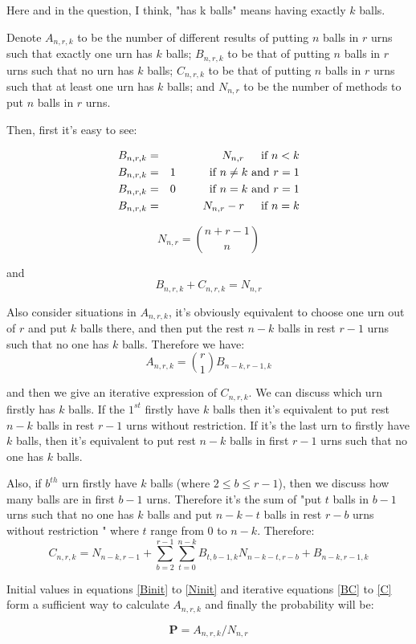 \documentclass[11pt]{article}
\begin{document}
Here and in the question, I think, "has k balls" means having exactly $k$ balls.

Denote $A_{n,r,k}$ to be the number of different results of putting $n$ balls in $r$ urns such that exactly one urn has $k$ balls; $B_{n,r,k}$ to be that of putting $n$ balls in $r$ urns such that no urn has $k$ balls;  $C_{n,r,k}$ to be that of putting $n$ balls in $r$ urns such that at least one urn has $k$ balls; and $N_{n,r}$ to be the number of methods to put $n$ balls in $r$ urns.

Then, first it's easy to see:

\begin{eqnarray} \label{Binit}
B_{n,r,k} &=& N_{n,r} \hspace{1.5em} \text{if $n < k$} \\
B_{n,r,k} &=& 1 \hspace{3em} \text{if $n \neq k$ and $r = 1$} \\
B_{n,r,k} &=& 0 \hspace{3em} \text{if $n = k$ and $r = 1$} \\
B_{n,r,k} &=& N_{n,r} - r \hspace{1.5em} \text{if $n = k$} 
\end{eqnarray}

\begin{equation} \label{Ninit}
N_{n,r} = \binom{n+r-1}{n}
\end{equation}

and 
\begin{equation} \label{BC}
B_{n,r,k} + C_{n,r,k} = N_{n,r}
\end{equation}

Also consider situations in $A_{n,r,k}$, it's obviously equivalent to choose one urn out of $r$ and put $k$ balls there, and then put the rest $n-k$ balls in rest $r-1$ urns such that no one has $k$ balls. Therefore we have:
\begin{equation} \label{A} 
A_{n,r,k} = \binom{r}{1} B_{n-k,r-1,k}
\end{equation}

and then we give an iterative expression of $C_{n,r,k}$. We can discuss which urn firstly has $k$ balls. If the $1^{st}$ firstly have $k$ balls then it's equivalent to put rest $n-k$ balls in rest $r-1$ urns without restriction. If it's the last urn to firstly have $k$ balls, then it's equivalent to put rest $n-k$ balls in first $r-1$ urns such that no one has $k$ balls.

Also, if $b^{th}$ urn firstly have $k$ balls (where $2 \le b \le r-1$), then we discuss how many balls are in first $b-1$ urns. Therefore it's the sum of "put $t$ balls in $b-1$ urns such that no one has $k$ balls and put $n-k-t$ balls in rest $r-b$ urns without restriction " where $t$ range from $0$ to $n-k$. Therefore:
\begin{equation} \label{C} 
C_{n,r,k} = N_{n-k,r-1} + \sum^{r-1}_{b=2} \sum_{t=0}^{n-k} B_{t,b-1,k} N_{n-k-t,r-b} + B_{n-k,r-1,k}
\end{equation}

Initial values in equations \ref{Binit} to \ref{Ninit} and iterative equations \ref{BC} to \ref{C} form a sufficient way to calculate $A_{n,r,k}$ and finally the probability will be:

$$\textbf{P} = A_{n,r,k} / N_{n,r}$$
\end{document}
